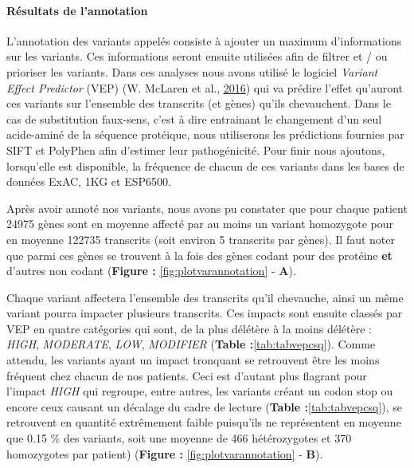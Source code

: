 \documentclass[12pt,twoside]{reedthesis}
\theoremstyle{definition}
\theoremstyle{definition}
\theoremstyle{remark}
\begin{document}
  \newpage
  
  \paragraph{Résultats de l'annotation}\label{resultats-de-lannotation}
  
  L'annotation des variants appelés consiste à ajouter un maximum
  d'informations sur les variants. Ces informations seront ensuite
  utilisées afin de filtrer et / ou prioriser les variants. Dans ces
  analyses nous avons utilisé le logiciel \emph{Variant Effect Predictor}
  (VEP) (W. McLaren et al., \protect\hyperlink{ref-McLaren2016}{2016}) qui
  va prédire l'effet qu'auront ces variants sur l'ensemble des transcrits
  (et gènes) qu'ils chevauchent. Dans le cas de substitution faux-sens,
  c'est à dire entrainant le changement d'un seul acide-aminé de la
  séquence protéique, nous utiliserons les prédictions fournies par SIFT
  et PolyPhen afin d'estimer leur pathogénicité. Pour finir nous ajoutons,
  lorsqu'elle est disponible, la fréquence de chacun de ces variants dans
  les bases de données ExAC, 1KG et ESP6500.
  
  Après avoir annoté nos variants, nous avons pu constater que pour chaque
  patient 24975 gènes sont en moyenne affecté par au moins un variant
  homozygote pour en moyenne 122735 transcrits (soit environ 5 transcrits
  par gènes). Il faut noter que parmi ces gènes se trouvent à la fois des
  gènes codant pour des protéine \textbf{et} d'autres non codant
  (\textbf{Figure : }\ref{fig:plotvarannotation} - \textbf{A}).
  
  Chaque variant affectera l'ensemble des transcrits qu'il chevauche,
  ainsi un même variant pourra impacter plusieurs transcrits. Ces impacts
  sont ensuite classés par VEP en quatre catégories qui sont, de la plus
  délétère à la moins délétère : \emph{HIGH}, \emph{MODERATE}, \emph{LOW},
  \emph{MODIFIER} (\textbf{Table :}\ref{tab:tabvepcsq}). Comme attendu,
  les variants ayant un impact tronquant se retrouvent être les moins
  fréquent chez chacun de nos patients. Ceci est d'autant plus flagrant
  pour l'impact \emph{HIGH} qui regroupe, entre autres, les variants
  créant un codon stop ou encore ceux causant un décalage du cadre de
  lecture (\textbf{Table :}\ref{tab:tabvepcsq}), se retrouvent en quantité
  extrêmement faible puisqu'ils ne représentent en moyenne que 0.15 \% des
  variants, soit une moyenne de 466 hétérozygotes et 370 homozygotes par
  patient) (\textbf{Figure : }\ref{fig:plotvarannotation} - \textbf{B}).
  
\end{document}

